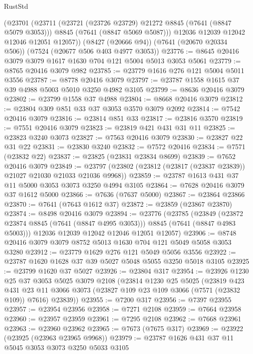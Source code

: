 \begin{lexlean}{RustStd}
\begin{coremodule}
{\begin{coremodule}
{{{{{{{{{{{{{{{{{{{{{{{{{{{{{{{{      (@23701
        (@23711
          (@23721 (@23726 @23729) @21272 @8845 (@7641 (@8847 @5079 @3053)))
          @8845
          (@7641 (@8847 @5069 @5087)))
        @12036
        @12039
        @12042
        @12046
        @12051
        @12057))
    (@8427 (@20666 @94))
    (@7641 (@20670 @20334 @506))
    (@7524 (@20677 @506 @403 @4977 @3053))
@23776 := @8645 @20416 @3079 @3079 @1617 @1630 @704 @121 @5004 @5013 @3053 @5061
@23779 := @8765 @20416 @3079 @982
@23785 := @23779 @1616 @276 @121 @5004 @5011 @3556
@23787 := @8778 @20416 @3079
@23797 := @23787 @1558 @1615 @37 @39 @4988 @5003 @5010 @3250 @4982 @3105
@23799 := @8636 @20416 @3079
@23802 := @23799 @1558 @37 @4988
@23804 := @8668 @20416 @3079
@23812 := @23804 @309 @851 @33 @37 @3053 @3570 @3079 @2092
@23814 := @7542 @20416 @3079
@23816 := @23814 @851 @33
@23817 := @23816 @3570
@23819 := @7551 @20416 @3079
@23823 := @23819 @421 @431 @31 @11
@23825 := @23823 @3240 @3073
@23827 := @7563 @20416 @3079
@23830 := @23827 @22 @31 @22
@23831 := @23830 @3240
@23832 := @7572 @20416
@23834 := @7571 (@23832 @22)
@23837 := @23825 (@23831 @23834 @8699)
@23839 := @7652 @20416 @3079
@23849 := @23797 (@23802 (@23812 (@23817 (@23837 @23839)) @21027 @21030 @21033 @21036 @9968))
@23859 := @23787 @1613 @431 @37 @11 @5000 @3053 @3073 @3250 @4994 @3105
@23864 := @7628 @20416 @3079 @37 @1612 @5000
@23866 := @7636 (@7637 @5000)
@23867 := @23864 @23866
@23870 := @7641 (@7643 @1612 @37)
@23872 := @23859 (@23867 @23870)
@23874 := @8498 @20416 @3079
@23894 := @23776
    (@23785
      (@23849 (@23872 @23874 @8845 (@7641 (@8847 @4995 @3053))) @8845 (@7641 (@8847 @4983 @5003)))
      @12036
      @12039
      @12042
      @12046
      @12051
      @12057)
@23906 := @8748 @20416 @3079 @3079 @8752 @5013 @1630 @704 @121 @5049 @5058 @3053 @3280
@23912 := @23779 @1629 @276 @121 @5049 @5056 @3556
@23922 := @23787 @1620 @1628 @37 @39 @5027 @5048 @5055 @3250 @5018 @3105
@23925 := @23799 @1620 @37 @5027
@23926 := @23804 @317
@23954 := @23926
    @1230
    @25
    @37
    @3053
    @5025
    @3079
    @2108
    (@23814
      @1230
      @25
      @5025
      (@23819
        @423
        @431
        @23
        @11
        @3066
        @3073
        (@23827 @109 @23 @109 @3066 (@7571 (@23832 @109)) @7616)
        @23839))
@23955 := @7200 @317
@23956 := @7397 @23955
@23957 := @23954 @23956
@23958 := @7271 @2108
@23959 := @7664 @23958
@23960 := @23957 @23959
@23961 := @7295 @2108
@23962 := @7668 @23961
@23963 := @23960 @23962
@23965 := @7673 (@7675 @317)
@23969 := @23922 (@23925 (@23963 @23965 @9968))
@23979 := @23787 @1626 @431 @37 @11 @5045 @3053 @3073 @3250 @5033 @3105
}}}}}}}}}}}}}}}}}}}}}}}}}}}}}}}}
\end{coremodule}}
\end{coremodule}
\end{lexlean}

